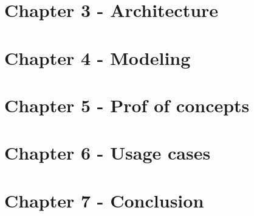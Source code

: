 \section{Chapter 3 - Architecture}


\section{Chapter 4 - Modeling}


\section{Chapter 5 - Prof of concepts}


\section{Chapter 6 - Usage cases}

\section{Chapter 7 - Conclusion}